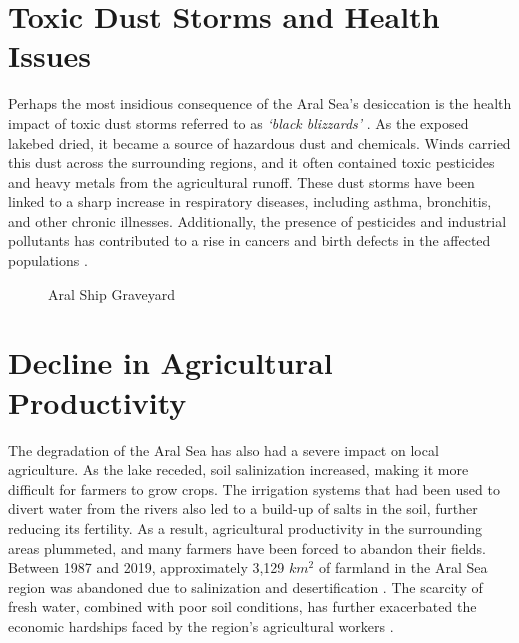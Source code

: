 \section{Toxic Dust Storms and Health Issues}
Perhaps the most insidious consequence of the Aral Sea's desiccation is the health impact of toxic dust storms referred to as \textit{`black blizzards'} \autocite{upperdarby2025geotext}. As the exposed lakebed dried, it became a source of hazardous dust and chemicals. Winds carried this dust across the surrounding regions, and it often contained toxic pesticides and heavy metals from the agricultural runoff. These dust storms have been linked to a sharp increase in respiratory diseases, including asthma, bronchitis, and other chronic illnesses. Additionally, the presence of pesticides and industrial pollutants has contributed to a rise in cancers and birth defects in the affected populations \autocite{whishwilson2002crisis}.

\begin{figure}
    \centering
    \caption{Aral Ship Graveyard}
    \label{fig:aral-grave}
\end{figure}

\section{Decline in Agricultural Productivity}
The degradation of the Aral Sea has also had a severe impact on local agriculture. As the lake receded, soil salinization increased, making it more difficult for farmers to grow crops. The irrigation systems that had been used to divert water from the rivers also led to a build-up of salts in the soil, further reducing its fertility. As a result, agricultural productivity in the surrounding areas plummeted, and many farmers have been forced to abandon their fields.
Between 1987 and 2019, approximately 3,129 $km^2$ of farmland in the Aral Sea region was abandoned due to salinization and desertification \autocite{shi2022farmland}. The scarcity of fresh water, combined with poor soil conditions, has further exacerbated the economic hardships faced by the region's agricultural workers \autocite{unesco2000vision}.

